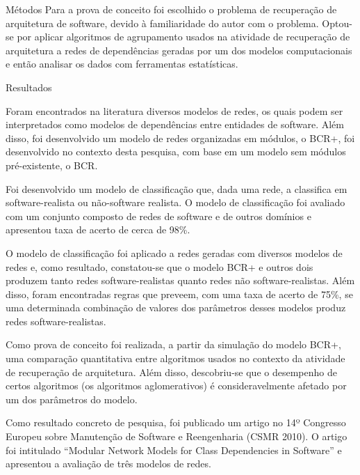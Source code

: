 \begin{section}{Métodos}
	Para a prova de conceito foi escolhido o problema de recuperação de arquitetura de software, devido à familiaridade do autor com o problema. Optou-se por aplicar algoritmos de agrupamento usados na atividade de recuperação de arquitetura a redes de dependências geradas por um dos modelos computacionais e então analisar os dados com ferramentas estatísticas.

\end{section}

\begin{section}{Resultados}
	
	Foram encontrados na literatura diversos modelos de redes, os quais podem ser interpretados como modelos de dependências entre entidades de software. Além disso, foi desenvolvido um modelo de redes organizadas em módulos, o BCR+, foi desenvolvido no contexto desta pesquisa, com base em um modelo sem módulos pré-existente, o BCR.
	
	Foi desenvolvido um modelo de classificação que, dada uma rede, a classifica em software-realista ou não-software realista. O modelo de classificação foi avaliado com um conjunto composto de redes de software e de outros domínios e apresentou taxa de acerto de cerca de 98\%.
	
	O modelo de classificação foi aplicado a redes geradas com diversos modelos de redes e, como resultado, constatou-se que o modelo BCR+ e outros dois produzem tanto redes software-realistas quanto redes não software-realistas. Além disso, foram encontradas regras que preveem, com uma taxa de acerto de 75\%, se uma determinada combinação de valores dos parâmetros desses modelos produz redes software-realistas.
	
	Como prova de conceito foi realizada, a partir da simulação do modelo BCR+, uma comparação quantitativa entre algoritmos usados no contexto da atividade de recuperação de arquitetura. Além disso, descobriu-se que o desempenho de certos algoritmos (os algoritmos aglomerativos) é consideravelmente afetado por um dos parâmetros do modelo.
	
	Como resultado concreto de pesquisa, foi publicado um artigo no 14º Congresso Europeu sobre Manutenção de Software e Reengenharia (CSMR 2010). O artigo foi intitulado ``Modular Network Models for Class Dependencies in Software'' e apresentou a avaliação de três modelos de redes.

	
\end{section}

